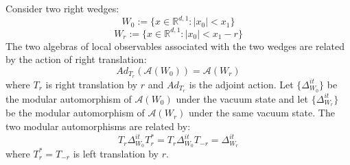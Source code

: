 \documentclass[a4paper,11pt]{article}
\theoremstyle{definition}
\begin{document}
Consider two right wedges:
\begin{equation}
    W_0 := \{x\in\mathbb{R}^{d,1}: |x_0| < x_1\}
\end{equation}
\begin{equation}
    W_{r} := \{x\in\mathbb{R}^{d,1}: |x_0 | < x_1 - r \}
\end{equation}
The two algebras of local observables associated with the two wedges are related by the action of right translation:
\begin{equation}
    Ad_{T_r}(\mathcal{A}(W_0)) = \mathcal{A}(W_r)
\end{equation}
where $T_r$ is right translation by $r$ and $Ad_{T_r}$ is the adjoint action. Let $\{\Delta_{W_0}^{it}\}$ be the modular automorphism of $\mathcal{A}(W_0)$ under the vacuum state and let $\{\Delta_{W_r}^{it}\}$ be the modular automorphism of $\mathcal{A}(W_r)$ under the same vacuum state. The two modular automorphisms are related by:
\begin{equation}
    T_r\Delta_{W_0}^{it}T_r^* = T_r\Delta_{W_0}^{it}T_{-r} = \Delta^{it}_{W_r}
\end{equation}
where $T_r^* = T_{-r}$ is left translation by $r$.
\end{document}
